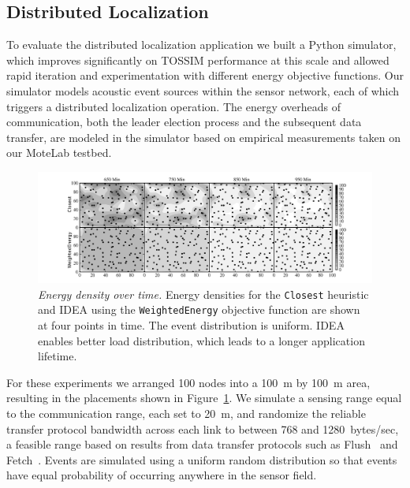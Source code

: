 \subsection{Distributed Localization}

To evaluate the distributed localization application we built a Python
simulator, which improves significantly on TOSSIM performance at this scale
and allowed rapid iteration and experimentation with different energy
objective functions. Our simulator models acoustic event sources within the
sensor network, each of which triggers a distributed localization operation.
The energy overheads of communication, both the leader election process and
the subsequent data transfer, are modeled in the simulator based on empirical
measurements taken on our MoteLab testbed.

\begin{figure}[t]
\begin{center}
\includegraphics[width=\hsize]{./figs/graph_density_vs_time0406_2151.png}
\end{center}

\caption{\textit{Energy density over time.} Energy densities for the
\texttt{Closest} heuristic and IDEA using the \texttt{WeightedEnergy}
objective function are shown at four points in time. The event distribution
is uniform. IDEA enables better load distribution, which leads to a longer
application lifetime.}

\label{fig-localizationdensityvtime}
\end{figure}

For these experiments we arranged 100 nodes into a 100~m by 100~m area,
resulting in the placements shown in
Figure~\ref{fig-localizationdensityvtime}. We simulate a sensing range equal
to the communication range, each set to 20~m, and randomize the reliable
transfer protocol bandwidth across each link to between 768 and
1280~bytes/sec, a feasible range based on results from data transfer
protocols such as Flush~\cite{flush-sensys07} and
Fetch~\cite{volcano-osdi06}. Events are simulated using a uniform random
distribution so that events have equal probability of occurring anywhere in
the sensor field.

